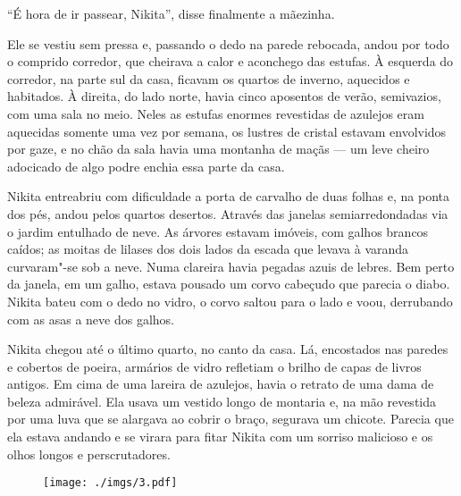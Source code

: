 ``É hora de ir passear, Nikita'', disse finalmente a mãezinha.

Ele se vestiu sem pressa e, passando o dedo na parede rebocada, andou
por todo o comprido corredor, que cheirava a calor e aconchego das
estufas. À esquerda do corredor, na parte sul da casa, ficavam os
quartos de inverno, aquecidos e habitados. À direita, do lado norte,
havia cinco aposentos de verão, semivazios, com uma sala no meio. Neles
as estufas enormes revestidas de azulejos eram aquecidas somente uma vez
por semana, os lustres de cristal estavam envolvidos por gaze, e no chão
da sala havia uma montanha de maçãs --- um leve cheiro adocicado de algo
podre enchia essa parte da casa.

Nikita entreabriu com dificuldade a porta de carvalho de duas folhas e,
na ponta dos pés, andou pelos quartos desertos. Através das janelas
semiarredondadas via o jardim entulhado de neve. As árvores estavam
imóveis, com galhos brancos caídos; as moitas de lilases dos dois lados
da escada que levava à varanda curvaram"-se sob a neve. Numa clareira
havia pegadas azuis de lebres. Bem perto da janela, em um galho, estava
pousado um corvo cabeçudo que parecia o diabo. Nikita bateu com o dedo
no vidro, o corvo saltou para o lado e voou, derrubando com as asas a neve dos
galhos.

Nikita chegou até o último quarto, no canto da casa. Lá, encostados nas
paredes e cobertos de poeira, armários de vidro refletiam o
brilho de capas de livros antigos. Em cima de uma lareira de
azulejos, havia o retrato de uma dama de beleza admirável. Ela usava
um vestido longo de montaria e, na mão revestida por uma luva que se
alargava ao cobrir o braço, segurava um chicote. Parecia que ela estava
andando e se virara para fitar Nikita com um sorriso malicioso e os
olhos longos e perscrutadores.

\begin{figure}
\vspace*{-2.1cm}
\hspace*{-2.5cm}\texttt{[image: ./imgs/3.pdf]}
\end{figure}


